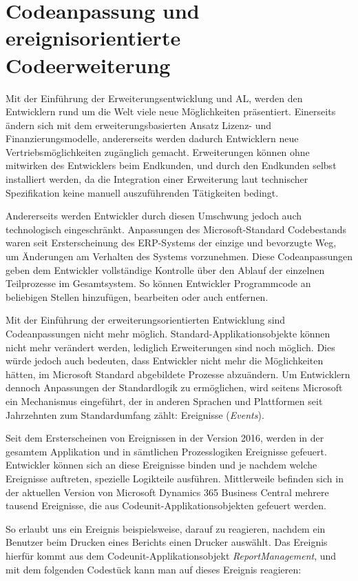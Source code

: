 \section{Codeanpassung und ereignisorientierte Codeerweiterung}
Mit der Einführung der Erweiterungsentwicklung und AL, werden den Entwicklern rund um die Welt viele neue Möglichkeiten präsentiert. Einerseits ändern sich mit dem erweiterungsbasierten Ansatz Lizenz- und Finanzierungsmodelle, andererseits werden dadurch Entwicklern neue Vertriebsmöglichkeiten zugänglich gemacht. Erweiterungen können ohne mitwirken des Entwicklers beim Endkunden, und durch den Endkunden selbst installiert werden, da die Integration einer Erweiterung laut technischer Spezifikation keine manuell auszuführenden Tätigkeiten bedingt.

Andererseits werden Entwickler durch diesen Umschwung jedoch auch technologisch eingeschränkt. Anpassungen des Microsoft-Standard Codebestands waren seit Ersterscheinung des ERP-Systems der einzige und bevorzugte Weg, um Änderungen am Verhalten des Systems vorzunehmen. Diese Codeanpassungen geben dem Entwickler vollständige Kontrolle über den Ablauf der einzelnen Teilprozesse im Gesamtsystem. So können Entwickler Programmcode an beliebigen Stellen hinzufügen, bearbeiten oder auch entfernen.

Mit der Einführung der erweiterungsorientierten Entwicklung sind Codeanpassungen nicht mehr möglich. Standard-Applikationsobjekte können nicht mehr verändert werden, lediglich Erweiterungen sind noch möglich. Dies würde jedoch auch bedeuten, dass Entwickler nicht mehr die Möglichkeiten hätten, im Microsoft Standard abgebildete Prozesse abzuändern. Um Entwicklern dennoch Anpassungen der Standardlogik zu ermöglichen, wird seitens Microsoft ein Mechanismus eingeführt, der in anderen Sprachen und Plattformen seit Jahrzehnten zum Standardumfang zählt: Ereignisse (\textit{Events}).

Seit dem Ersterscheinen von Ereignissen in der Version 2016, werden in der gesamtem Applikation und in sämtlichen Prozesslogiken Ereignisse gefeuert. Entwickler können sich an diese Ereignisse binden und je nachdem welche Ereignisse auftreten, spezielle Logikteile ausführen. Mittlerweile befinden sich in der aktuellen Version von Microsoft Dynamics 365 Business Central mehrere tausend Ereignisse, die aus Codeunit-Applikationsobjekten gefeuert werden.

So erlaubt uns ein Ereignis beispielsweise, darauf zu reagieren, nachdem ein Benutzer beim Drucken eines Berichts einen Drucker auswählt. Das Ereignis hierfür kommt aus dem Codeunit-Applikationsobjekt \textit{ReportManagement}, und mit dem folgenden Codestück kann man auf dieses Ereignis reagieren: 


